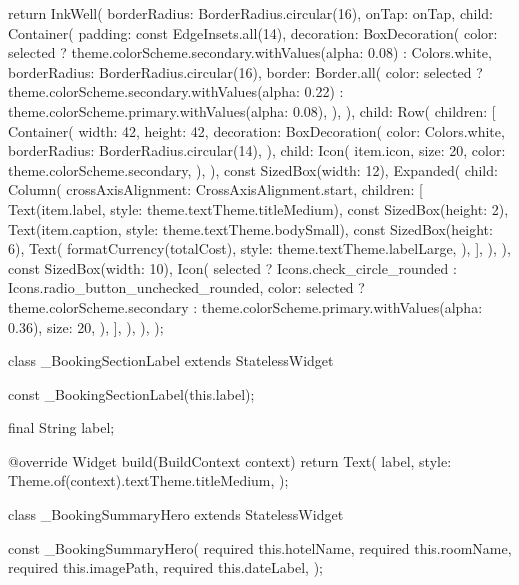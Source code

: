 \documentclass[11pt,a4paper]{article}
\begin{document}
\begin{codeblock}
{{    return InkWell(
      borderRadius: BorderRadius.circular(16),
      onTap: onTap,
      child: Container(
        padding: const EdgeInsets.all(14),
        decoration: BoxDecoration(
          color: selected
              ? theme.colorScheme.secondary.withValues(alpha: 0.08)
              : Colors.white,
          borderRadius: BorderRadius.circular(16),
          border: Border.all(
            color: selected
                ? theme.colorScheme.secondary.withValues(alpha: 0.22)
                : theme.colorScheme.primary.withValues(alpha: 0.08),
          ),
        ),
        child: Row(
          children: [
            Container(
              width: 42,
              height: 42,
              decoration: BoxDecoration(
                color: Colors.white,
                borderRadius: BorderRadius.circular(14),
              ),
              child: Icon(
                item.icon,
                size: 20,
                color: theme.colorScheme.secondary,
              ),
            ),
            const SizedBox(width: 12),
            Expanded(
              child: Column(
                crossAxisAlignment: CrossAxisAlignment.start,
                children: [
                  Text(item.label, style: theme.textTheme.titleMedium),
                  const SizedBox(height: 2),
                  Text(item.caption, style: theme.textTheme.bodySmall),
                  const SizedBox(height: 6),
                  Text(
                    formatCurrency(totalCost),
                    style: theme.textTheme.labelLarge,
                  ),
                ],
              ),
            ),
            const SizedBox(width: 10),
            Icon(
              selected
                  ? Icons.check_circle_rounded
                  : Icons.radio_button_unchecked_rounded,
              color: selected
                  ? theme.colorScheme.secondary
                  : theme.colorScheme.primary.withValues(alpha: 0.36),
              size: 20,
            ),
          ],
        ),
      ),
    );
  }
}

class _BookingSectionLabel extends StatelessWidget {
  const _BookingSectionLabel(this.label);

  final String label;

  @override
  Widget build(BuildContext context) {
    return Text(
      label,
      style: Theme.of(context).textTheme.titleMedium,
    );
  }
}

class _BookingSummaryHero extends StatelessWidget {
  const _BookingSummaryHero({
    required this.hotelName,
    required this.roomName,
    required this.imagePath,
    required this.dateLabel,
  });

}
\end{codeblock}
\end{document}
